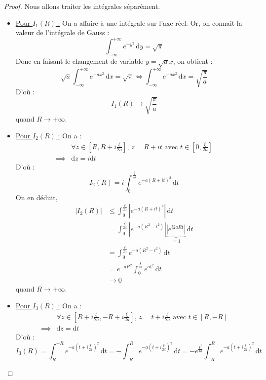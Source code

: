 \begin{proof}
    Nous allons traiter les intégrales séparément.
    \begin{itemize}
      \item \uline{Pour $I_1(R)$ :} On a affaire à une intégrale sur l'axe réel. Or, on connait la valeur de l'intégrale de Gauss :
      \[ \int_{-\infty}^{+\infty} e^{-y^2} \, \mathrm{d}y = \sqrt{\pi} \]
      Donc en faisant le changement de variable $y = \sqrt{a}x$, on obtient :
      \[ \sqrt{a} \int_{-\infty}^{+\infty} e^{-ax^2} \, \mathrm{d}x = \sqrt{\pi} \iff \int_{-\infty}^{+\infty} e^{-ax^2} \, \mathrm{d}x = \sqrt{\frac{\pi}{a}} \]
      D'où :
      \[ I_1(R) \longrightarrow \sqrt{\frac{\pi}{a}} \]
      quand $R \longrightarrow +\infty$.
      \item \uline{Pour $I_2(R)$ :} On a :
      \begin{align*}
        &\forall z \in \left[ R, R + i \frac{\xi}{2a} \right], \, z = R + it \text{ avec $t \in \left[ 0, \frac{\xi}{2a} \right]$} \\
        \implies& \mathrm{d}z = i\mathrm{d}t
      \end{align*}
      D'où :
      \[ I_2(R) = i \int_0^{\frac{\xi}{2a}} e^{-a (R+it)^2} \, \mathrm{d}t \]
      On en déduit,
      \begin{align*}
        |I_2(R)| &\leq \int_0^{\frac{\xi}{2a}} \left| e^{-a (R+it)^2} \right| \, \mathrm{d}t \\
        &= \int_0^{\frac{\xi}{2a}} \left| e^{-a(R^2 - t^2)} \right| \underbrace{\left| e^{i 2aRt} \right|}_{= 1} \, \mathrm{d}t \\
        &= \int_0^{\frac{\xi}{2a}} e^{-a(R^2 - t^2)} \, \mathrm{d}t \\
        &= e^{-aR^2} \int_0^{\frac{\xi}{2a}} e^{at^2} \, \mathrm{d}t \\
        &\longrightarrow 0
      \end{align*}
      quand $R \longrightarrow +\infty$.
      \item \uline{Pour $I_3(R)$ :} On a :
      \begin{align*}
        &\forall z \in \left[ R + i \frac{\xi}{2a}, -R + i \frac{\xi}{2a} \right], \, z = t + i\frac{\xi}{2a} \text{ avec $t \in \left[ R, -R \right]$} \\
        \implies& \mathrm{d}z = \mathrm{d}t
      \end{align*}
      D'où :
      \[ I_3(R) = \int_R^{-R} e^{-a \left(t + i \frac{\xi}{2a} \right)^2} \, \mathrm{d}t = - \int_{-R}^R e^{-a \left(t + i \frac{\xi}{2a} \right)^2} \, \mathrm{d}t = - e^{\frac{\xi^2}{4a}} \int_{-R}^R e^{-a \left( t + i \frac{\xi}{2a} \right)^2} \, \mathrm{d}t \]

\end{itemize}
\end{proof}
